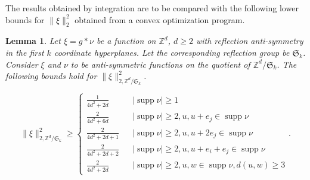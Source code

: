 \documentclass[a4paper, 12pt, notitlepage]{amsart}
\newcommand{\supp}{\operatorname{supp}}
\newcommand{\zed}{\mathbb{Z}}
\newcommand{\fS}{{\mathfrak{S}}}
\newtheorem{lemma}[theorem]{Lemma}
\theoremstyle{remark}
\begin{document}
The results obtained by integration are to be compared with the following lower bounds for $\|\xi\|_2^2$ obtained from a convex optimization program.
\begin{lemma}\label{program_lower_bounds}
 Let $\xi = g*\nu$ be a function on $\zed^d$, $d \geq 2$ with reflection anti-symmetry in the first $k$ coordinate hyperplanes. Let the corresponding reflection group be $\fS_k$.  Consider $\xi$ and $\nu$ to be anti-symmetric functions on the quotient of $\zed^d/\fS_k$. The following bounds hold for $\|\xi\|_{2, \zed^d/\fS_k}^2$.
 
 \begin{equation}
  \|\xi\|_{2, \zed^d/\fS_k}^2 \geq \left\{ \begin{array}{lll}\frac{1}{4d^2 + 2d} && |\supp \nu| \geq 1\\ \frac{2}{4d^2 + 6d} && |\supp \nu| \geq 2, u, u+e_j \in \supp \nu\\
  \frac{2}{4d^2 + 2d+1} && |\supp \nu| \geq 2, u, u+2e_j \in \supp \nu\\
  \frac{2}{4d^2 + 2d+2} && |\supp \nu| \geq 2, u, u+e_i +e_j \in \supp \nu\\
  \frac{2}{4d^2 + 2d} && |\supp \nu| \geq 2, u, w \in \supp \nu, d(u,w)\geq 3\end{array}\right..
 \end{equation}

\end{lemma}
\end{document}
